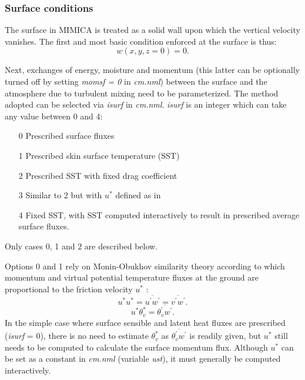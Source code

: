 \documentclass[12pt,A4,french]{article}
\begin{document}
\subsubsection{Surface conditions}
\label{surface}

The surface in MIMICA is treated as a solid wall upon which the vertical velocity vanishes. The first and most basic condition enforced at the surface is thus:
\begin{equation}
w\left(x,y,z=0\right) = 0.
\end{equation}

Next, exchanges of energy, moisture and momentum (this latter can be optionally turned off by setting {\it momsf = 0} in {\it cm.nml}) between the surface and the atmosphere due to turbulent mixing need to be parameterized. The method adopted can be selected via {\it isurf}  in {\it cm.nml}. {\it isurf} is an integer which can take any value between 0 and 4:
\begin{itemize}
\item[0] Prescribed surface fluxes
\item[1] Prescribed skin surface temperature (SST)
\item[2] Prescribed SST with fixed drag coefficient 
\item[3] Similar to 2 but with $u^{*}$ defined as in \cite{Gra1998}
\item[4] Fixed SST, with SST computed interactively to result in prescribed average surface fluxes.
\end{itemize}
Only cases 0, 1 and 2 are described below.

Options 0 and 1 rely on Monin-Obukhov similarity theory according to which momentum and virtual potential temperature fluxes at the ground are proportional to the friction velocity $u^{*}$ \cite{Stull88}:
\begin{equation}
u^{*}u^{*} = \overline{u^{\prime}w^{\prime}} = \overline{v^{\prime}w^{\prime}}.
\label{sfmom}
\end{equation}
\begin{equation}
u^{*}\theta_v^{*} = \overline{\theta_v^{\prime}w^{\prime}}.
\label{sftem}
\end{equation}
In the simple case where surface sensible and latent heat fluxes are prescribed ({\it isurf} = 0), there is no need to estimate $\theta_v^{*}$ as $\overline{\theta_v^{\prime}w^{\prime}}$ is readily given, but $u^{*}$ still needs to be computed to calculate the surface momentum flux. Although $u^{*}$ can be set as a constant in {\it cm.nml} (variable {\it ust}), it must generally be computed interactively.
\end{document}
